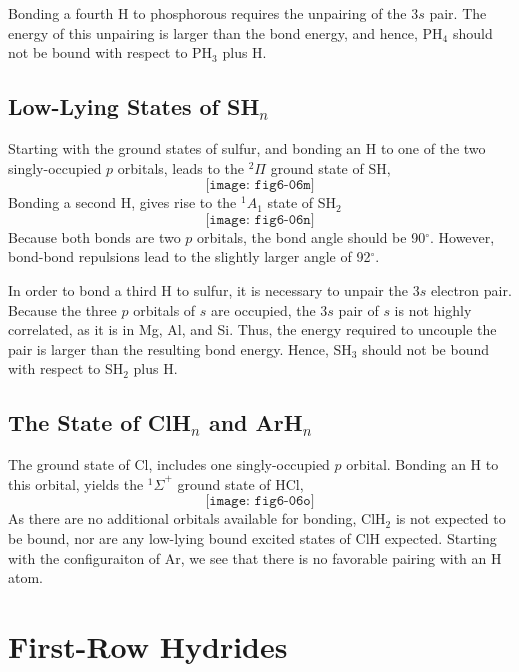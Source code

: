 Bonding a fourth H to phosphorous requires the unpairing of the $3s$ 
pair.  The energy of this unpairing is larger than the bond energy, 
and hence, PH$_4$ should not be bound with respect to PH$_3$ plus H.

\subsection{Low-Lying States of SH$_n$}

Starting with the ground states of sulfur, and bonding an H to one of 
the two singly-occupied $p$ orbitals, leads to the ${^2\Pi}$ ground 
state of SH,
\begin{equation}
\texttt{[image: fig6-06m]}
\end{equation}
Bonding a second H, gives rise to the ${^1A}_1$ state of SH$_2$
\begin{equation}
\texttt{[image: fig6-06n]}
\end{equation}
Because both bonds are two $p$ orbitals, the bond angle should be 
90$^{\circ}$.  However, bond-bond repulsions lead to the slightly 
larger angle of 92$^{\circ}$.

In order to bond a third H to sulfur, it is necessary to unpair the 
$3s$ electron pair.  Because the three $p$ orbitals of $s$ are 
occupied, the $3s$ pair of $s$ is not highly correlated, as it is in 
Mg, Al, and Si.  Thus, the energy required to uncouple the pair is 
larger than the resulting bond energy.  Hence, SH$_3$ should not be 
bound with respect to SH$_2$ plus H.

\subsection{The State of ClH$_n$ and ArH$_n$}

The ground state of Cl, includes one singly-occupied $p$ orbital.  
Bonding an H to this orbital, yields the ${^1\Sigma}^+$ ground state 
of HCl,
\begin{equation}
\texttt{[image: fig6-06o]}
\end{equation}
As there are no additional orbitals available for bonding, ClH$_2$ is 
not expected to be bound, nor are any low-lying bound excited states 
of ClH expected.  Starting with the configuraiton of Ar, we see that 
there is no favorable pairing with an H atom.

\section{First-Row Hydrides}

